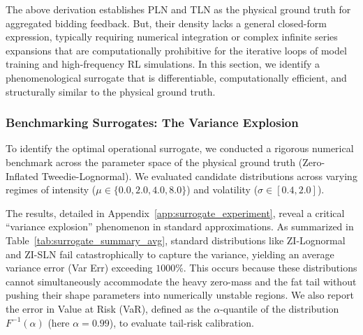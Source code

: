 \documentclass[sigconf, anonymous, review]{acmart}
\begin{document}
The above derivation establishes PLN and TLN as the physical ground truth for aggregated bidding feedback.
But, their density lacks a general closed-form expression, typically requiring numerical integration or complex infinite series expansions \cite{dunn2005tweedie} that are computationally prohibitive for the iterative loops of model training and high-frequency RL simulations. In this section, we identify a phenomenological surrogate that is differentiable, computationally efficient, and structurally similar to the physical ground truth.

\subsubsection{Benchmarking Surrogates: The Variance Explosion}
\label{ssec:surrogate_benchmark_main}

To identify the optimal operational surrogate, we conducted a rigorous numerical benchmark across the parameter space of the physical ground truth (Zero-Inflated Tweedie-Lognormal). We evaluated candidate distributions across varying regimes of intensity ($\mu \in \{0.0, 2.0, 4.0, 8.0\}$) and volatility ($\sigma \in [0.4, 2.0]$).

The results, detailed in Appendix~\ref{app:surrogate_experiment}, reveal a critical ``variance explosion'' phenomenon in standard approximations.
As summarized in Table~\ref{tab:surrogate_summary_avg}, standard distributions like ZI-Lognormal and ZI-SLN fail catastrophically to capture the variance, yielding an average variance error (Var Err) exceeding $1000\%$. This occurs because these distributions cannot simultaneously accommodate the heavy zero-mass and the fat tail without pushing their shape parameters into numerically unstable regions.
We also report the error in Value at Risk (VaR), defined as the $\alpha$-quantile of the distribution $F^{-1}(\alpha)$ (here $\alpha=0.99$), to evaluate tail-risk calibration. 

\begin{table}[h]
\centering
\caption{Global average performance across all intensity regimes ($\mu \in \{0, 2, 4, 8\}$).}
\label{tab:surrogate_summary_avg}
\end{table}
\end{document}
